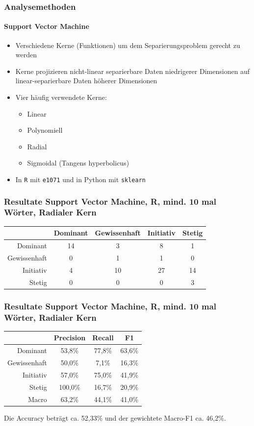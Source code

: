 \documentclass{beamer}
\begin{document}
\begin{frame}
\frametitle{Analysemethoden}
\framesubtitle{Support Vector Machine}
\begin{itemize}\setlength\parskip{12pt}
	\item Verschiedene Kerne (Funktionen) um dem Separierungsproblem gerecht zu werden
	\item Kerne projizieren nicht-linear separierbare Daten niedrigerer Dimensionen auf linear-separierbare Daten höherer Dimensionen
	\item Vier häufig verwendete Kerne:
	\begin{itemize}
		\item Linear
		\item Polynomiell
		\item Radial
		\item Sigmoidal (Tangens hyperbolicus)
	\end{itemize}
	\item In \texttt{R} mit \texttt{e1071} und in Python mit \texttt{sklearn}
\end{itemize}
\end{frame}
\begin{frame}
\frametitle{Resultate Support Vector Machine, R, mind. 10 mal Wörter, Radialer Kern}
\begin{center}
\begin{tabular}{r|c|c|c|c|}
 &  Dominant  & Gewissenhaft & Initiativ & Stetig\\
\hline
Dominant & 14 & 3 & 8 & 1 \\
Gewissenhaft & 0 & 1 & 1 & 0\\
Initiativ & 4 & 10 & 27 & 14\\
Stetig & 0 & 0 & 0 & 3
\end{tabular}
\end{center}
\end{frame}
\begin{frame}
\frametitle{Resultate Support Vector Machine, R, mind. 10 mal Wörter, Radialer Kern}
\begin{center}
	\begin{tabular}{r|c|c|c|}
		& Precision  & Recall & F1 \\
		\hline
		Dominant     & 53,8\% & 77,8\% & 63,6\% \\
		Gewissenhaft & 50,0\% & 7,1\% & 16,3\% \\
		Initiativ    & 57,0\% & 75,0\% & 41,9\% \\
		Stetig       & 100,0\% & 16,7\% & 20,9\% \\
		\hline
		Macro        & 63,2\% & 44,1\% & 41,0\%
	\end{tabular}
\end{center}
Die Accuracy beträgt ca. 52,33\% und der gewichtete Macro-F1 ca. 46,2\%.
\end{frame}
\end{document}
